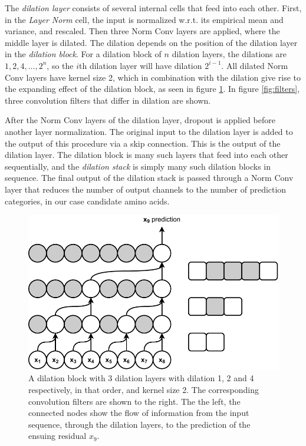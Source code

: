 The \textit{dilation layer} consists of several internal cells that feed into each other. First, in the \textit{Layer Norm} cell, the input is normalized w.r.t. its empirical mean and variance, and rescaled. Then three Norm Conv layers are applied, where the middle layer is dilated. The dilation depends on the position of the dilation layer in the \textit{dilation block}. For a dilation block of $n$ dilation layers, the dilations are $1, 2, 4, \ldots, 2^n$, so the $i$th dilation layer will have dilation $2^{i - 1}$. All dilated Norm Conv layers have kernel size 2, which in combination with the dilation give rise to the expanding effect of the dilation block, as seen in figure \ref{fig:dilation_layers}. In figure \ref{fig:filters}, three convolution filters that differ in dilation are shown. 

After the Norm Conv layers of the dilation layer, dropout is applied before another layer normalization. The original input to the dilation layer is added to the output of this procedure via a skip connection. This is the output of the dilation layer. The dilation block is many such layers that feed into each other sequentially, and the \textit{dilation stack} is simply many such dilation blocks in sequence. The final output of the dilation stack is passed through a Norm Conv layer that reduces the number of output channels to the number of prediction categories, in our case candidate amino acids.

\begin{figure}[H]
    \centering
    \includegraphics{report/figures/wavenet.pdf}
    \caption{A dilation block with 3 dilation layers with dilation 1, 2 and 4 respectively, in that order, and kernel size 2. The corresponding convolution filters are shown to the right. The the left, the connected nodes show the flow of information from the input sequence, through the dilation layers, to the prediction of the ensuing residual $x_9$.}
    \label{fig:dilation_layers}
\end{figure}

